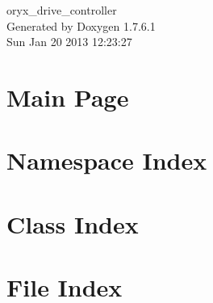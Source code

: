 \documentclass[a4paper]{book}
\begin{document}
\begin{titlepage}
\vspace*{7cm}
\begin{center}
{\Large oryx\-\_\-drive\-\_\-controller }\\
\vspace*{1cm}
{\large \-Generated by Doxygen 1.7.6.1}\\
\vspace*{0.5cm}
{\small Sun Jan 20 2013 12:23:27}\\
\end{center}
\end{titlepage}
\clearemptydoublepage
{}
\tableofcontents
\clearemptydoublepage
{}
\chapter{\-Main \-Page}
\label{index}
\chapter{\-Namespace \-Index}

\chapter{\-Class \-Index}

\chapter{\-File \-Index}

\end{document}
